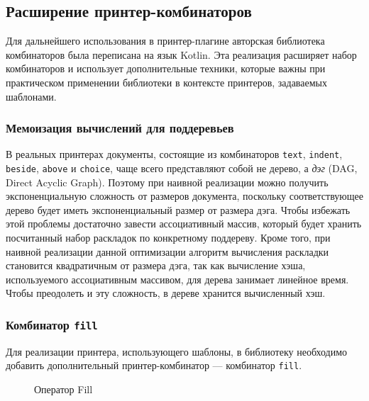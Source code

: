 

\newpage
\subsection{Расширение принтер-комбинаторов}

Для дальнейшего использования в принтер-плагине авторская библиотека комбинаторов
была переписана на язык Kotlin.
Эта реализация расширяет набор комбинаторов и использует
дополнительные техники, которые важны при практическом применении библиотеки в
контексте принтеров, задаваемых шаблонами.

\subsubsection{Мемоизация вычислений для поддеревьев}

В реальных принтерах документы, состоящие из комбинаторов
\lstinline[language=Haskell]{text},
\lstinline[language=Haskell]{indent},
\lstinline[language=Haskell]{beside},
\lstinline[language=Haskell]{above} и \lstinline[language=Haskell]{choice}, чаще всего
представляют собой не дерево, а \emph{дэг} (DAG, Direct Acyclic Graph). Поэтому при наивной
реализации можно получить экспоненциальную сложность от размеров документа,
поскольку соответствующее дерево будет иметь экспоненциальный размер от размера дэга.
Чтобы избежать этой проблемы достаточно завести ассоциативный массив,
который будет хранить посчитанный набор раскладок по конкретному поддереву.
Кроме того, при наивной реализации данной оптимизации
алгоритм вычисления раскладки становится квадратичным от размера дэга,
так как вычисление хэша, используемого ассоциативным массивом, для дерева занимает
линейное время. Чтобы преодолеть и эту сложность, в дереве хранится вычисленный хэш.

\subsubsection{Комбинатор \lstinline{fill}}

Для реализации принтера, использующего шаблоны, в библиотеку необходимо добавить
дополнительный принтер-комбинатор --- комбинатор \lstinline{fill}.

\begin{figure}[h!]
  \centering
	\quad
	\caption{Оператор Fill}
\end{figure}

